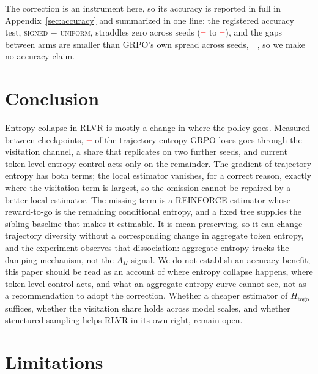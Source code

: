 \documentclass[11pt]{article}
\newcommand{\Htogo}{H_{\mathrm{togo}}}
\newcommand{\AH}{A_{H}}
\providecommand{\PENDING}{\textcolor{red}{\textbf{--}}}
\newcommand{\num}[1]{\ifcsname #1\endcsname\csname #1\endcsname\else\PENDING\fi}
\begin{document}
The correction is an instrument here, so its accuracy is reported in full in
Appendix~\ref{sec:accuracy} and summarized in one line: the registered accuracy test,
\textsc{signed} $-$ \textsc{uniform}, straddles zero across seeds
($\num{CLosigneduniformacc}$ to $\num{CHisigneduniformacc}$), and the gaps between arms
are smaller than GRPO's own spread across seeds, $\num{Sgrpoacc}$, so we make no
accuracy claim.

\section{Conclusion}
\label{sec:conclusion}

Entropy collapse in RLVR is mostly a change in where the policy goes. Measured between
checkpoints, $\num{DecGrpoShare}$ of the trajectory entropy GRPO loses goes through the
visitation channel, a share that replicates on two further seeds, and current token-level entropy control acts only on
the remainder. The gradient of trajectory entropy has both terms; the local estimator
vanishes, for a correct reason, exactly where the visitation term is largest, so the
omission cannot be repaired by a better local estimator. The missing term is a
REINFORCE estimator whose reward-to-go is the remaining conditional entropy, and a
fixed tree supplies the sibling baseline that makes it estimable. It is
mean-preserving, so it can change trajectory diversity without a corresponding change
in aggregate token entropy, and the experiment observes that dissociation: aggregate
entropy tracks the damping mechanism, not the $\AH$ signal. We do not establish an
accuracy benefit; this paper should be read as an account of where entropy collapse
happens, where token-level control acts, and what an aggregate entropy curve cannot
see, not as a recommendation to adopt the correction. Whether a cheaper estimator of
$\Htogo$ suffices, whether the visitation share holds across model scales, and
whether structured sampling helps RLVR in its own right, remain open.


\section*{Limitations}
\end{document}
